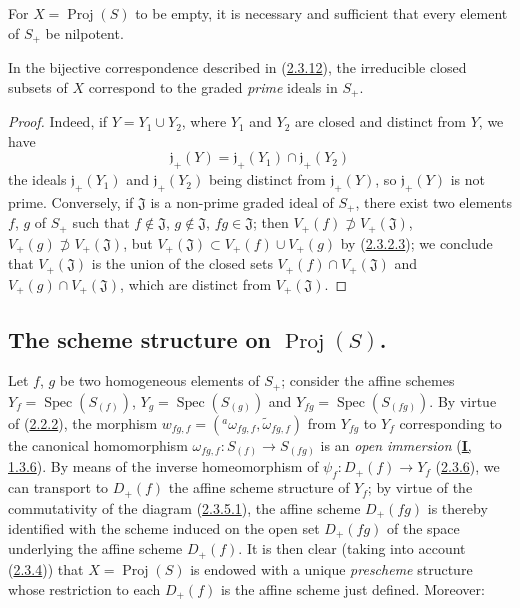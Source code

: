 \begin{corollary}[2.3.16]
\label{II.2.3.16}
For $X=\operatorname{Proj}(S)$ to be empty, it is necessary and sufficient
that every element of $S_+$ be nilpotent.
\end{corollary}

\begin{corollary}[2.3.17]
\label{II.2.3.17}
In the bijective correspondence described in
\textup{(\hyperref[II.2.3.12]{2.3.12})}, the irreducible closed subsets of $X$
correspond to the graded \emph{prime} ideals in $S_+$.
\end{corollary}

\begin{proof}
Indeed, if $Y=Y_1\cup Y_2$, where $Y_1$ and $Y_2$ are closed and distinct
from $Y$, we have
\[
  \mathfrak{j}_+(Y)
  =\mathfrak{j}_+(Y_1)\cap\mathfrak{j}_+(Y_2)
\]
the ideals $\mathfrak{j}_+(Y_1)$ and $\mathfrak{j}_+(Y_2)$ being distinct
from $\mathfrak{j}_+(Y)$, so $\mathfrak{j}_+(Y)$ is not prime.
Conversely, if $\mathfrak{J}$ is a non-prime graded ideal of $S_+$, there
exist two elements $f$, $g$ of $S_+$ such that
$f\notin\mathfrak{J}$, $g\notin\mathfrak{J}$, $fg\in\mathfrak{J}$; then
$V_+(f)\not\supset V_+(\mathfrak{J})$,
$V_+(g)\not\supset V_+(\mathfrak{J})$, but
$V_+(\mathfrak{J})\subset V_+(f)\cup V_+(g)$ by
(\hyperref[II.2.3.2.3]{2.3.2.3}); we conclude that
$V_+(\mathfrak{J})$ is the union of the closed sets
$V_+(f)\cap V_+(\mathfrak{J})$ and $V_+(g)\cap V_+(\mathfrak{J})$, which are
distinct from $V_+(\mathfrak{J})$.
\end{proof}


\subsection{The scheme structure on $\operatorname{Proj}(S)$.}
\label{subsection:II.2.4}

\begin{env}[2.4.1]
\label{II.2.4.1}
Let $f$, $g$ be two homogeneous elements of $S_+$; consider the affine
schemes $Y_f=\operatorname{Spec}(S_{(f)})$,
$Y_g=\operatorname{Spec}(S_{(g)})$ and
$Y_{fg}=\operatorname{Spec}(S_{(fg)})$. By virtue of
(\hyperref[II.2.2.2]{2.2.2}), the morphism
$w_{fg,f}=({}^a\omega_{fg,f},\widetilde{\omega}_{fg,f})$ from $Y_{fg}$ to
$Y_f$ corresponding to the canonical homomorphism
$\omega_{fg,f}:S_{(f)}\to S_{(fg)}$ is an \emph{open immersion}
(\hyperref[I.1.3.6]{\textbf{I}, 1.3.6}). By means of the inverse homeomorphism
of $\psi_f:D_+(f)\to Y_f$ (\hyperref[II.2.3.6]{2.3.6}), we can
transport to $D_+(f)$ the affine scheme structure of $Y_f$; by virtue of
the commutativity of the diagram (\hyperref[II.2.3.5.1]{2.3.5.1}), the
affine scheme $D_+(fg)$ is thereby identified with the scheme induced on the
open set $D_+(fg)$ of the space underlying the affine scheme $D_+(f)$. It is
then clear (taking into account (\hyperref[II.2.3.4]{2.3.4})) that
$X=\operatorname{Proj}(S)$ is endowed with a unique \emph{prescheme}
structure whose restriction to each $D_+(f)$ is the affine scheme just
defined. Moreover:
\end{env}

